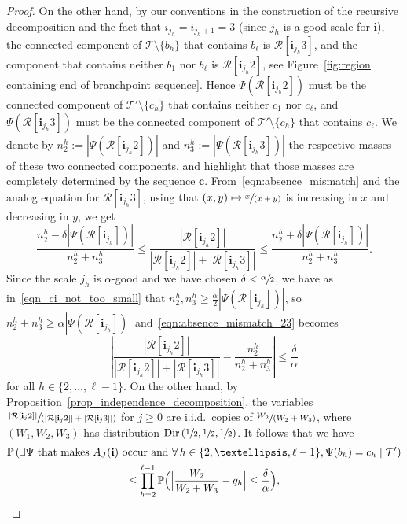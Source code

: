 \documentclass[11pt]{article}
\let\backslash\setminus
\newcommand{\spfrac}[2]{\sfrac{#1}{(#2)}}
\newcommand{\BPp}[1]{\mathbb{P} \Bigl(#1\Bigr)}
\newcommand{\Ppsq}[2]{\mathbb{P} \left(#1\mathrel{}\middle|\mathrel{}#2\right)}
\newcommand{\Tt}{\mathcal{T}}
\newcommand{\Rr}{\mathcal{R}}
\newcommand{\ii}{\mathbf{i}}
\newcommand{\Dir}{\mathrm{Dir}}
\theoremstyle{plain}
\theoremstyle{definition}
\numberwithin{equation}{section}
\begin{document}
\begin{proof}
On the other hand, by our conventions in the construction of the recursive decomposition and the fact that $i_{j_h}=i_{j_h+1}=3$ (since $j_h$ is a good scale for $\ii$), the connected component of $\Tt \backslash\{ b_h \}$ that contains $b_{\ell}$ is $\Rr[\ii_{j_h}3]$, and the component that contains neither $b_1$ nor $b_{\ell}$ is $\Rr[\ii_{j_h}2]$, see Figure~\ref{fig:region containing end of branchpoint sequence}.
Hence $\Psi \left( \Rr[\ii_{j_h}2] \right)$ must be the connected component of $\Tt' \backslash \{c_h\}$ that contains neither $c_1$ nor $c_{\ell}$, and $\Psi \left( \Rr[\ii_{j_h}3] \right)$ must be the connected component of $\Tt' \backslash \{c_h\}$ that contains $c_{\ell}$.
We denote by $n^h_2:=|\Psi \left( \Rr[\ii_{j_h}2] \right)|$ and $n^h_3:=|\Psi \left( \Rr[\ii_{j_h} 3] \right)|$ the respective masses of these two connected components, and highlight that those masses are completely determined by the sequence $\mathbf{c}$.
From~\eqref{eqn:absence_mismatch} and the analog equation for $\Rr[\ii_{j_h}3]$, using that $(x,y) \mapsto \spfrac{x}{x+y}$ is increasing in $x$ and decreasing in $y$, we get
\begin{equation}\label{eqn:absence_mismatch_23}
\frac{n^{h}_2 - \delta \left| \Psi \left( \Rr[\ii_{j_h}] \right) \right|}{n^{h}_2+n^{h}_3} \leq \frac{\left| \Rr[\ii_{j_h}2] \right|}{\left| \Rr[\ii_{j_h}2] \right|+\left| \Rr[\ii_{j_h}3] \right|} \leq \frac{n^{h}_2+\delta \left| \Psi \left( \Rr[\ii_{j_h}] \right) \right|}{n^{h}_2+n^{h}_3}.
\end{equation}
Since the scale $j_h$ is $\alpha$-good and we have chosen $\delta<\sfrac{\alpha}{2}$, we have as in~\eqref{eqn_ci_not_too_small} that $n^{h}_2, n^h_3 \geq \frac{\alpha}{2} \left| \Psi \left( \Rr[\ii_{j_h}] \right) \right|$, so $n_2^h+n_3^h \geq \alpha \left| \Psi \left( \Rr[\ii_{j_h}] \right) \right|$ and~\eqref{eqn:absence_mismatch_23} becomes
\[ \left| \frac{\left| \Rr[\ii_{j_h}2] \right|}{\left| \Rr[\ii_{j_h}2] \right|+\left| \Rr[\ii_{j_h}3] \right|}-\frac{n^{h}_2}{n^{h}_2+n^{h}_3} \right| \leq \frac{\delta}{\alpha} \]
for all $h\in\{2,\dots,\ell-1\}$. On the other hand, by Proposition~\ref{prop_independence_decomposition}, the variables $\spfrac{\left| \Rr[\ii_{j}2] \right|}{\left| \Rr[\ii_{j}2] \right|+\left| \Rr[\ii_{j}3] \right|}$ for $j \geq 0$ are i.i.d.\ copies of $\spfrac{W_2}{W_2+W_3}$, where $(W_1, W_2, W_3)$ has distribution $\Dir \left( \sfrac12, \sfrac12, \sfrac12 \right)$.
It follows that we have
\begin{multline*}
\Ppsq{\exists \Psi \text{ that makes $A_J(\ii)$ occur and }\forall \, h\in\{2,\dots,\ell-1\}, \Psi(b_h)=c_h}{ \mathcal{T'}} \\ \leq \prod_{h=2}^{\ell-1} \BPp{ \Bigl| \frac{W_2}{W_2+W_3}-q_h \Bigr| \leq \frac{\delta}{\alpha} },

\end{multline*}
\end{proof}
\end{document}
